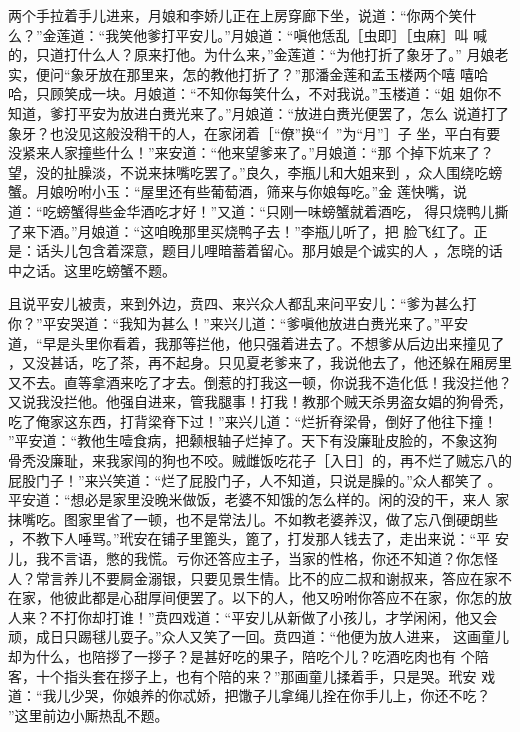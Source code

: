 两个手拉着手儿进来，月娘和李娇儿正在上房穿廊下坐，说道：“你两个笑什
么？”金莲道：“我笑他爹打平安儿。”月娘道：“嗔他恁乱［虫即］［虫麻］叫
喊的，只道打什么人？原来打他。为什么来，”金莲道：“为他打折了象牙了。”
月娘老实，便问“象牙放在那里来，怎的教他打折了？”那潘金莲和孟玉楼两个嘻
嘻哈哈，只顾笑成一块。月娘道：“不知你每笑什么，不对我说。”玉楼道：“姐
姐你不知道，爹打平安为放进白赉光来了。”月娘道：“放进白赉光便罢了，怎么
说道打了象牙？也没见这般没稍干的人，在家闭着［“僚”换“亻”为“月”］子
坐，平白有要没紧来人家撞些什么！”来安道：“他来望爹来了。”月娘道：“那
个掉下炕来了？望，没的扯臊淡，不说来抹嘴吃罢了。”良久，李瓶儿和大姐来到
，众人围绕吃螃蟹。月娘吩咐小玉：“屋里还有些葡萄酒，筛来与你娘每吃。”金
莲快嘴，说道：“吃螃蟹得些金华酒吃才好！”又道：“只刚一味螃蟹就着酒吃，
得只烧鸭儿撕了来下酒。”月娘道：“这咱晚那里买烧鸭子去！”李瓶儿听了，把
脸飞红了。正是：话头儿包含着深意，题目儿哩暗蓄着留心。那月娘是个诚实的人
，怎晓的话中之话。这里吃螃蟹不题。

且说平安儿被责，来到外边，贲四、来兴众人都乱来问平安儿：“爹为甚么打
你？”平安哭道：“我知为甚么！”来兴儿道：“爹嗔他放进白赉光来了。”平安
道，“早是头里你看着，我那等拦他，他只强着进去了。不想爹从后边出来撞见了
，又没甚话，吃了茶，再不起身。只见夏老爹来了，我说他去了，他还躲在厢房里
又不去。直等拿酒来吃了才去。倒惹的打我这一顿，你说我不造化低！我没拦他？
又说我没拦他。他强自进来，管我腿事！打我！教那个贼天杀男盗女娼的狗骨秃，
吃了俺家这东西，打背梁脊下过！”来兴儿道：“烂折脊梁骨，倒好了他往下撞！
”平安道：“教他生噎食病，把颡根轴子烂掉了。天下有没廉耻皮脸的，不象这狗
骨秃没廉耻，来我家闯的狗也不咬。贼雌饭吃花子［入日］的，再不烂了贼忘八的
屁股门子！”来兴笑道：“烂了屁股门子，人不知道，只说是臊的。”众人都笑了
。平安道：“想必是家里没晚米做饭，老婆不知饿的怎么样的。闲的没的干，来人
家抹嘴吃。图家里省了一顿，也不是常法儿。不如教老婆养汉，做了忘八倒硬朗些
，不教下人唾骂。”玳安在铺子里篦头，篦了，打发那人钱去了，走出来说：“平
安儿，我不言语，憋的我慌。亏你还答应主子，当家的性格，你还不知道？你怎怪
人？常言养儿不要屙金溺银，只要见景生情。比不的应二叔和谢叔来，答应在家不
在家，他彼此都是心甜厚间便罢了。以下的人，他又吩咐你答应不在家，你怎的放
人来？不打你却打谁！”贲四戏道：“平安儿从新做了小孩儿，才学闲闲，他又会
顽，成日只踢毬儿耍子。”众人又笑了一回。贲四道：“他便为放人进来，
这画童儿却为什么，也陪拶了一拶子？是甚好吃的果子，陪吃个儿？吃酒吃肉也有
个陪客，十个指头套在拶子上，也有个陪的来？”那画童儿揉着手，只是哭。玳安
戏道：“我儿少哭，你娘养的你忒娇，把馓子儿拿绳儿拴在你手儿上，你还不吃？
”这里前边小厮热乱不题。

